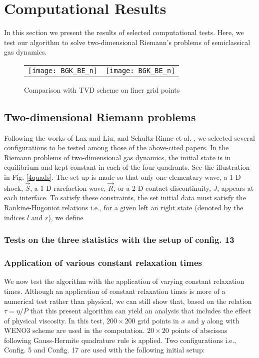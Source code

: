 \documentclass{rsproca}%
\begin{document}
\section{Computational Results}
\label{results}

In this section we present the results of selected computational tests.  Here, we test our algorithm to solve two-dimensional Riemann's problems of semiclassical gas dynamics.

\begin{figure}[hbt]
\centering
\begin{tabular}{cc}
\texttt{[image: BGK\_BE\_n]} \label{TVDp} & 
\texttt{[image: BGK\_BE\_n]} \label{WENOp} \\
\end{tabular}
\caption{Comparison with TVD scheme on finer grid points}
\label{WENOTVD2D}
\end{figure}

\subsection{Two-dimensional Riemann problems}
\label{Riemannp}
Following the works of Lax and Liu, \cite{Laxliu95} and Schultz-Rinne et al. \cite{schultzrinne}, we selected several configurations to be tested among those of the above-cited papers. In the Riemann problems of two-dimensional gas dynamics, the initial state is in equilibrium and kept constant in each of the four quadrants. See the illustration in Fig. \ref{4quads}. The set up is made so that only one elementary wave, a 1-D  shock, $\vec{S}$, a 1-D rarefaction wave, $\vec{R}$, or a 2-D contact discontinuity, $J$, appears at each interface.
To satisfy these constraints, the set initial data must satisfy the Rankine-Hugoniot relations i.e., for a given left an right state (denoted by the indices $l$ and $r$), we define

\subsubsection{Tests on the three statistics with the setup of config. 13}
\label{configuration13}

\subsubsection{Application of various constant relaxation times}
\label{difftau}
We now test the algorithm with the application of varying constant relaxation times. Although an application of constant relaxation times is more of a numerical test rather than physical, we can still show that, based on the relation $\tau = \eta/P$ that this present algorithm can yield an analysis that includes the effect of physical viscosity. In this test, $200 \times 200$ grid points in $x$ and $y$ along with WENO3 scheme are used in the computation. $20 \times 20$ points of abscissas following Gauss-Hermite quadrature rule is applied. Two configurations i.e., Config. 5 and Config. 17 are used with the following initial setup:
\end{document}
